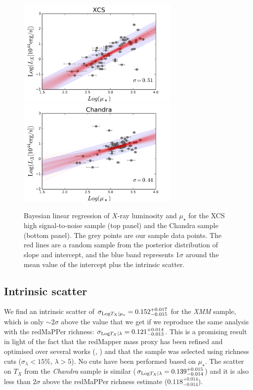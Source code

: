 \begin{figure}
\centering
\includegraphics[width=0.7\textwidth]{./chapters/chapter5/figs/xmm_lx_mu_scatter_Feb18.png}
\includegraphics[width=0.7\textwidth]{./chapters/chapter5/figs/chandra_lx_mu_scatter_Feb18.png}\caption{Bayesian linear regression of $X$-ray luminosity and $\mu_\star$ for the XCS high signal-to-noise sample (top panel) and the Chandra sample (bottom panel). The grey points are our sample data points. The red lines are a random sample from the posterior distribution of slope and intercept, and the blue band represents 1$\sigma$ around the mean value of the intercept plus the intrinsic scatter.}\label{fig:lx}
\end{figure}

\subsection{Intrinsic scatter}

We find an intrinsic scatter of $\sigma_{{\rm Log} T_X|\mu_\star} = 0.152^{+0.017}_{-0.015}$ for the \emph{XMM} sample, which is only $\sim 2 \sigma$ above the value that we get if we reproduce the same analysis with the redMaPPer richness: $\sigma_{{\rm Log} T_X|\lambda} = 0.121^{+0.014}_{-0.013}$. This is a promising result in light of the fact that the redMapper mass proxy has been refined and optimised over several works (\citealt{lambda}, \citealt{rozo09}) and that the sample was selected using richness cuts ($\sigma_\lambda<15\%$, $\lambda>5$). No cuts have been performed based on $\mu_\star$.
The scatter on $T_X$ from the \emph{Chandra} sample is similar ($\sigma_{{\rm Log} T_X|\lambda} = 0.139^{+0.015}_{-0.014}$) and it is also less than $2\sigma$ above the redMaPPer richness estimate ($0.118^{+0.014}_{-0.014}$).


